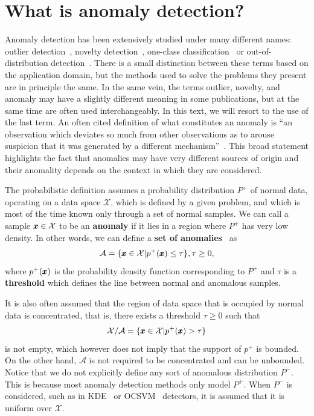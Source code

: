 \section{What is anomaly detection?} \label{sec:ad_definition}
Anomaly detection has been extensively studied under many different names: outlier detection~\cite{knorr98algorithms,hodge2004survey}, novelty detection~\cite{pimentel2014review}, one-class classification~\cite{ruff2018deep} or out-of-distribution detection~\cite{liang2017enhancing}. There is a small distinction between these terms based on the application domain, but the methods used to solve the problems they present are in principle the same. In the same vein, the terms outlier, novelty, and anomaly may have a slightly different meaning in some publications, but at the same time are often used interchangeably. In this text, we will resort to the use of the last term. An often cited definition of what constitutes an anomaly is ``an observation which deviates so much from other observations as to arouse suspicion that it was generated by a different mechanism''~\cite{barnett1974outliers}. This broad statement highlights the fact that anomalies may have very different sources of origin and their anomality depends on the context in which they are considered. 

The probabilistic definition assumes a probability distribution $P^+$ of normal data, operating on a data space $\mathcal{X}$, which is defined by a given problem, and which is most of the time known only through a set of normal samples. We can call a sample $\pmb{{x}} \in \mathcal{X}$ to be an \textbf{anomaly} if it lies in a region where $P^+$ has very low density. In other words, we can define a \textbf{set of anomalies}~\cite{ruff2020unifying} as 
\begin{equation} \label{eq:anomaly_set}
	\mathcal{A} = \lbrace \pmb{{x}} \in \mathcal{X} \vert p^+(\pmb{{x}}) \leq \tau \rbrace, \tau \geq 0,
\end{equation}
where $p^+(\pmb{{x}})$ is the probability density function corresponding to $P^+$ and $\tau$ is a \textbf{threshold} which defines the line between normal and anomalous samples. 

It is also often assumed that the region of data space that is occupied by normal data is concentrated, that is, there exists a threshold $\tau \geq 0$ such that
\begin{equation} \label{eq:normal_concentration}
	\mathcal{X} \slash \mathcal{A} = \lbrace \pmb{{x}} \in \mathcal{X} \vert p^+(\pmb{{x}}) > \tau \rbrace
\end{equation}
is not empty, which however does not imply that the support of $p^+$ is bounded. On the other hand, $\mathcal{A}$ is not required to be concentrated and can be unbounded. Notice that we do not explicitly define any sort of anomalous distribution $P^-$. This is because most anomaly detection methods only model $P^+$. When $P^-$ is considered, such as in KDE~\cite{parzen1962estimation} or OCSVM~\cite{scholkopf2001estimating} detectors, it is assumed that it is uniform over $\mathcal{X}$. 

